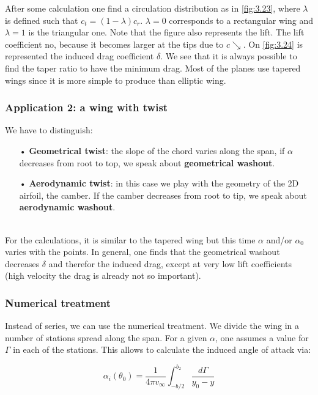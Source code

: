 	After some calculation one find a circulation distribution as in \autoref{fig:3.23}, where $\lambda$ is defined such that $c_t = (1- \lambda) c_r$. $\lambda = 0$ corresponds to a rectangular wing and $\lambda = 1$ is the triangular one. Note that the figure also represents the lift. The lift coefficient no, because it becomes larger at the tips due to $c\searrow$. On \autoref{fig:3.24} is represented the induced drag coefficient $\delta$. We see that it is always possible to find the taper ratio to have the minimum drag. Most of the planes use tapered wings since it is more simple to produce than elliptic wing. 
	
\subsubsection{Application 2: a wing with twist}
	We have to distinguish: 	
	\begin{itemize}
	\item[•] \textbf{Geometrical twist}: the slope of the chord varies along the span, if $\alpha$ decreases from root to top, we speak about \textbf{geometrical washout}. 
	\item[•] \textbf{Aerodynamic twist}: in this case we play with the geometry of the 2D airfoil, the camber. If the camber decreases from root to tip, we speak about \textbf{aerodynamic washout}. 
	\end{itemize}
	
	\ \\ For the calculations, it is similar to the tapered wing but this time $\alpha$ and/or $\alpha _0$ varies with the points. In general, one finds that the geometrical washout decreases $\delta$ and therefor the induced drag, except at very low lift coefficients (high velocity the drag is already not so important). 
	
\subsubsection{Numerical treatment}
	Instead of series, we can use the numerical treatment. We divide the wing in a number of stations spread along the span. For a given $\alpha$, one assumes a value for $\Gamma$ in each of the stations. This allows to calculate the induced angle of attack via: 
	
	\begin{equation}
	\alpha _i(\theta _0) = \frac{1}{4\pi v_\infty} \int _{-b/2}^{b_2} \frac{d\Gamma}{y_0- y}
	\end{equation}
	

